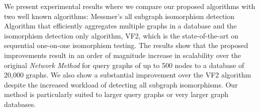We present experimental results where we compare our proposed algorithms with two well known algorithms: Messmer's\cite{messmer_bunke2000} all subgraph isomorphism 
detection Algorithm that efficiently aggregates multiple graphs in a database and the isomorphism detection only algorithm, VF2\cite{cordella2001_vf2}, which is the 
state-of-the-art on sequential one-on-one isomorphism testing. The results show that the proposed improvements result in an order of magnitude increase in scalability 
over the original \textit{Network Method}  for query graphs of up to 500 nodes to a database of 20,000 graphs. We also show a substantial improvement over the VF2 
algorithm despite the increased workload of detecting all subgraph isomorphisms. Our method is particularly suited to larger query graphs or very larger graph 
databases.
